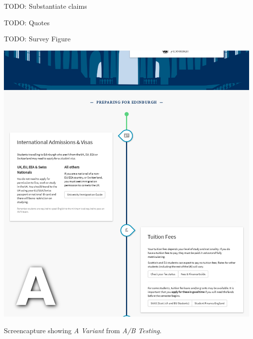 \documentclass[a4paper, notoc]{tufte-handout}
\begin{document}
TODO: Substantiate claims

TODO: Quotes

TODO: Survey Figure

\begin{marginfigure}
  \includegraphics[width=\linewidth]{avariant.png}
  \caption{
    \label{fig:avariant}
    Screencapture showing \textit{A Variant} from \textit{A/B Testing}.
  }

\end{marginfigure}
\end{document}
